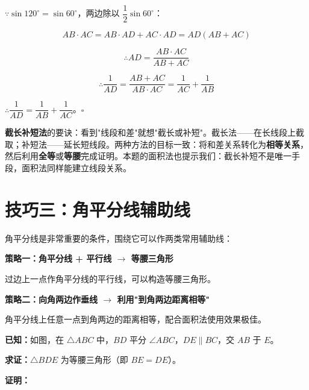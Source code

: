 \documentclass[12pt, a4paper]{ctexart}
\begin{document}
\(\because \sin 120^\circ = \sin 60^\circ\)，两边除以 \(\dfrac{1}{2} \sin 60^\circ\)：

\[AB \cdot AC = AB \cdot AD + AC \cdot AD = AD(AB + AC)\]

\[\therefore AD = \frac{AB \cdot AC}{AB + AC}\]

\[\therefore \frac{1}{AD} = \frac{AB + AC}{AB \cdot AC} = \frac{1}{AC} + \frac{1}{AB}\]

\(\therefore \dfrac{1}{AD} = \dfrac{1}{AB} + \dfrac{1}{AC}\)。\hfill\(\square\)

\begin{tipbox}[方法总结]
\textbf{截长补短法}的要诀：看到"线段和差"就想"截长或补短"。截长法——在长线段上截取；补短法——延长短线段。两种方法的目标一致：将和差关系转化为\textbf{相等关系}，然后利用\textbf{全等}或\textbf{等腰}完成证明。本题的面积法也提示我们：截长补短不是唯一手段，面积法同样能建立线段关系。
\end{tipbox}

\section*{\textcolor{mainblue}{技巧三：角平分线辅助线}}

\begin{knowledgebox}[角平分线辅助线的两种策略]
角平分线是非常重要的条件，围绕它可以作两类常用辅助线：

\medskip
\noindent\textbf{策略一：角平分线 + 平行线 \(\to\) 等腰三角形}

过边上一点作角平分线的平行线，可以构造等腰三角形。

\medskip
\noindent\textbf{策略二：向角两边作垂线 \(\to\) 利用"到角两边距离相等"}

角平分线上任意一点到角两边的距离相等，配合面积法使用效果极佳。
\end{knowledgebox}

\begin{examplebox}
\textbf{已知：}如图，在 \(\triangle ABC\) 中，\(BD\) 平分 \(\angle ABC\)，\(DE \parallel BC\)，交 \(AB\) 于 \(E\)。

\textbf{求证：}\(\triangle BDE\) 为等腰三角形（即 \(BE = DE\)）。
\end{examplebox}

\noindent\textbf{证明：}

\begin{center}
\end{center}
\end{document}
